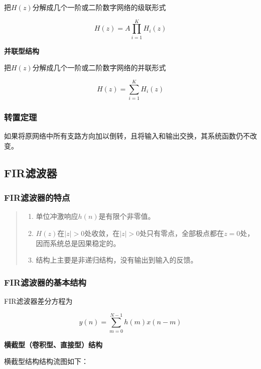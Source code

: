 \documentclass[cn, hazy, blue, normal, 14pt]{elegantnote}
\begin{document}
把$H(z)$分解成几个一阶或二阶数字网络的级联形式

\begin{equation}
    H(z)=A\prod_{i=1}^{K}H_i(z)
\end{equation}

\textbf{并联型结构}

把$H(z)$分解成几个一阶或二阶数字网络的并联形式

\begin{equation}
    H(z)=\sum_{i=1}^{K}H_i(z)
\end{equation}

\subsubsection{转置定理}

如果将原网络中所有支路方向加以倒转，且将输入和输出交换，其系统函数仍不改变。

\subsection{FIR滤波器}

\subsubsection{FIR滤波器的特点}

\begin{quote}
\begin{enumerate}
    \item 单位冲激响应$h(n)$是有限个非零值。
    \item $H(z)$在$|z|>0$处收敛，在$|z|>0$处只有零点，全部极点都在$z=0$处，因而系统总是因果稳定的。
    \item 结构上主要是非递归结构，没有输出到输入的反馈。
\end{enumerate}
\end{quote}

\subsubsection{FIR滤波器的基本结构}

FIR滤波器差分方程为

\begin{equation}
    y(n)=\sum_{m=0}^{N-1}h(m)x(n-m)
\end{equation}

\textbf{横截型（卷积型、直接型）结构}

横截型结构结构流图如下：
\end{document}
